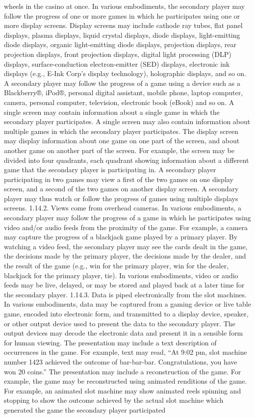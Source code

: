 \documentclass[11pt,a4paper]{article}
\begin{document}
wheels in the casino at once. In various embodiments, the secondary player may follow the progress of one or more games in which he participates using one or more display screens. Display screens may include cathode ray tubes, flat panel displays, plasma displays, liquid crystal displays, diode displays, light-emitting diode displays, organic light-emitting diode displays, projection displays, rear projection displays, front projection displays, digital light processing (DLP) displays, surface-conduction electron-emitter (SED) displays, electronic ink displays (e.g., E-Ink Corp's display technology), holographic displays, and so on. A secondary player may follow the progress of a game using a device such as a Blackberry®, iPod®, personal digital assistant, mobile phone, laptop computer, camera, personal computer, television, electronic book (eBook) and so on. A single screen may contain information about a single game in which the secondary player participates. A single screen may also contain information about multiple games in which the secondary player participates. The display screen may display information about one game on one part of the screen, and about another game on another part of the screen. For example, the screen may be divided into four quadrants, each quadrant showing information about a different game that the secondary player is participating in. A secondary player participating in two games may view a first of the two games on one display screen, and a second of the two games on another display screen. A secondary player may thus watch or follow the progress of games using multiple displays screens. 1.14.2. Views come from overhead cameras. In various embodiments, a secondary player may follow the progress of a game in which he participates using video and/or audio feeds from the proximity of the game. For example, a camera may capture the progress of a blackjack game played by a primary player. By watching a video feed, the secondary player may see the cards dealt in the game, the decisions made by the primary player, the decisions made by the dealer, and the result of the game (e.g., win for the primary player, win for the dealer, blackjack for the primary player, tie). In various embodiments, video or audio feeds may be live, delayed, or may be stored and played back at a later time for the secondary player. 1.14.3. Data is piped electronically from the slot machines. In various embodiments, data may be captured from a gaming device or live table game, encoded into electronic form, and transmitted to a display device, speaker, or other output device used to present the data to the secondary player. The output devices may decode the electronic data and present it in a sensible form for human viewing. The presentation may include a text description of occurrences in the game. For example, text may read, “At 9:02 pm, slot machine number 1423 achieved the outcome of bar-bar-bar. Congratulations, you have won 20 coins.” The presentation may include a reconstruction of the game. For example, the game may be reconstructed using animated renditions of the game. For example, an animated slot machine may show animated reels spinning and stopping to show the outcome achieved by the actual slot machine which generated the game the secondary player participated 
\end{document}
